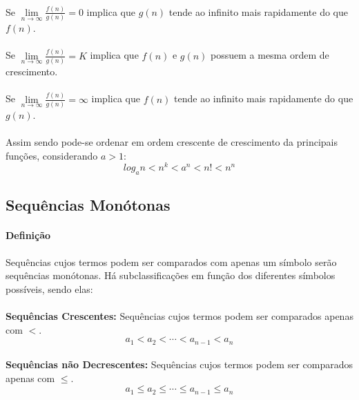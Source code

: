 \documentclass{article}
\begin{document}
            \paragraph{}Se $\lim\limits_{n\to\infty}\frac{f(n)}{g(n)}=0$ implica que $g(n)$ tende ao infinito mais rapidamente do que $f(n)$.
            \paragraph{}Se $\lim\limits_{n\to\infty}\frac{f(n)}{g(n)}=K$ implica que $f(n)$ e $g(n)$ possuem a mesma ordem de crescimento.
            \paragraph{}Se $\lim\limits_{n\to\infty}\frac{f(n)}{g(n)}=\infty$ implica que $f(n)$ tende ao infinito mais rapidamente do que $g(n)$.
            \paragraph{}Assim sendo pode-se ordenar em ordem crescente de crescimento da principais funções, considerando $a>1$:
                \begin{equation}
                    log_{a}n < n^k < a^n < n! < n^n 
                \end{equation}
                
        \subsection{Sequências Monótonas}
            \paragraph{Definição}Sequências cujos termos podem ser comparados com apenas um símbolo serão sequências monótonas. Há subclassificações em função dos diferentes símbolos possíveis, sendo elas:
            \paragraph{}\textbf{Sequências Crescentes:} Sequências cujos termos podem ser comparados apenas com $<$.
                \begin{equation}
                    a_1<a_2<\cdots<a_{n-1}<a_n
                \end{equation}
            \paragraph{}\textbf{Sequências não Decrescentes:} Sequências cujos termos podem ser comparados apenas com $\le$.
                \begin{equation}
                    a_1\le a_2\le \cdots \le a_{n-1} \le a_n
                \end{equation}
\end{document}
